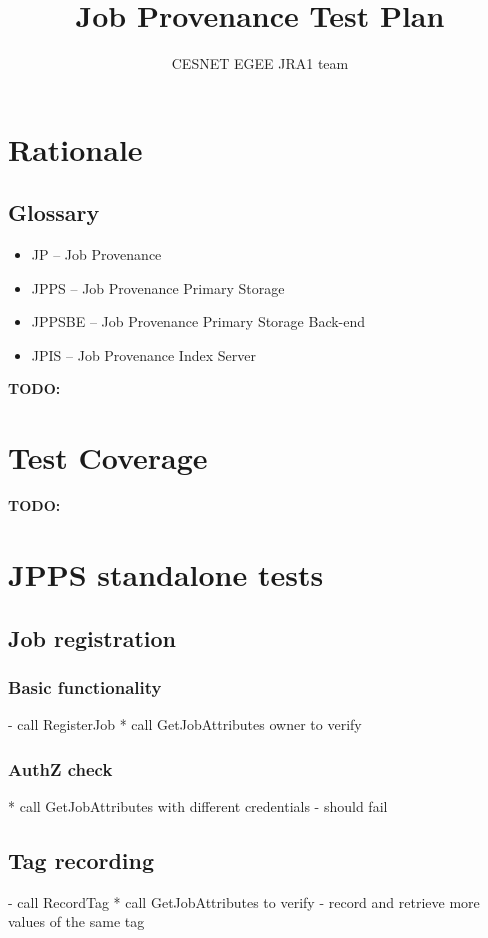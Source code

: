 \documentclass{egee}
\title{Job Provenance Test Plan}
\author{CESNET EGEE JRA1 team}
\def\todo#1{\textbf{TODO:} #1}
\begin{document}

\newpage
\tableofcontents
\newpage

\section{Rationale}
\subsection{Glossary}
\begin{itemize}
\item JP -- Job Provenance
\item JPPS -- Job Provenance Primary Storage
\item JPPSBE -- Job Provenance Primary Storage Back-end
\item JPIS -- Job Provenance Index Server
\end{itemize}

\todo{}

\section{Test Coverage}
\todo{}


\section{JPPS standalone tests}

\subsection{Job registration}

\subsubsection{Basic functionality}
- call RegisterJob
* call GetJobAttributes owner to verify

\subsubsection{AuthZ check}
* call GetJobAttributes with different credentials - should fail

\subsection{Tag recording}
- call RecordTag
* call GetJobAttributes to verify
- record and retrieve more values of the same tag
\end{document}
